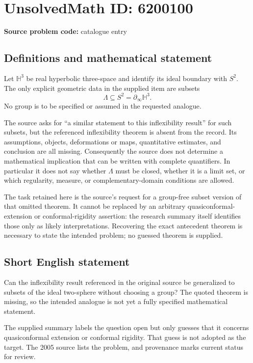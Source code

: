 \documentclass[11pt]{article}
\begin{document}
\section*{UnsolvedMath ID: 6200100}
\textbf{Source problem code:} catalogue entry
\subsection{Definitions and mathematical statement}
Let $\mathbb H^3$ be real hyperbolic three-space and identify its ideal boundary with $S^2$. The only explicit geometric data in the supplied item are subsets
\[
 \Lambda\subseteq S^2=\partial_\infty\mathbb H^3.
\]
No group is to be specified or assumed in the requested analogue.

The source asks for ``a similar statement to this inflexibility result'' for such subsets, but the referenced inflexibility theorem is absent from the record. Its assumptions, objects, deformations or maps, quantitative estimates, and conclusion are all missing. Consequently the source does not determine a mathematical implication that can be written with complete quantifiers. In particular it does not say whether $\Lambda$ must be closed, whether it is a limit set, or which regularity, measure, or complementary-domain conditions are allowed.

The task retained here is the source's request for a group-free subset version of that omitted theorem. It cannot be replaced by an arbitrary quasiconformal-extension or conformal-rigidity assertion: the research summary itself identifies those only as likely interpretations. Recovering the exact antecedent theorem is necessary to state the intended problem; no guessed theorem is supplied.
\subsection{Short English statement}
Can the inflexibility result referenced in the original source be generalized to subsets of the ideal two-sphere without choosing a group? The quoted theorem is missing, so the intended analogue is not yet a fully specified mathematical statement.

The supplied summary labels the question open but only guesses that it concerns quasiconformal extension or conformal rigidity. That guess is not adopted as the target. The 2005 source lists the problem, and provenance marks current status for review.
\end{document}
